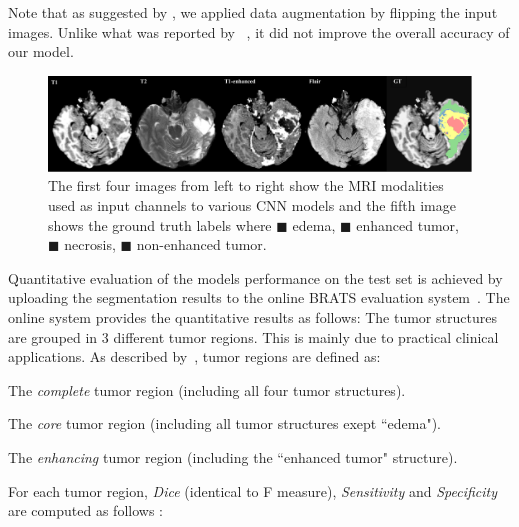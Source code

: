 \documentclass[final,5p,times,twocolumn]{elsarticle}
\begin{document}
Note that as suggested by \citet{Krizhevsky-2012-small}, we applied data augmentation by flipping the input images.  Unlike what was reported by ~\citet{zeiler2014},  it did not improve the overall accuracy of our model. 



%

\begin{figure}
\centering
\includegraphics[width=\linewidth]{data_tumor.pdf}
\caption{The first four images from left to right show the MRI modalities used as input channels to various CNN models and the fifth image shows the ground truth labels where \textcolor[RGB]{135,213,120}{$\blacksquare$} edema, \textcolor[RGB]{225,225,95}{$\blacksquare$} enhanced tumor,
\textcolor[RGB]{246,145,139}{$\blacksquare$} necrosis,
\textcolor[RGB]{124,167,208}{$\blacksquare$} non-enhanced tumor.}
\label{fig:data}
\end{figure} 

 Quantitative evaluation of the models performance on the test set is achieved by uploading the segmentation results to the online BRATS evaluation system~\citep{BRATSURL}. The online system provides the quantitative results as follows: 
The tumor structures are grouped in 3 different tumor regions. This is mainly due to practical clinical applications. 
As described by~\citet{Menze2014}, tumor regions are defined as:

\begin{enumerate}[a)]

{\setlength\itemindent{25pt} \item The {\it complete} tumor region (including all four tumor structures).}

{\setlength\itemindent{25pt}\item The {\it core} tumor region (including all tumor structures exept ``edema").}

{\setlength\itemindent{25pt}\item The {\it enhancing} tumor region (including the ``enhanced tumor" structure).}

\end{enumerate} 

For each tumor region, {\it Dice} (identical to F measure), {\it Sensitivity} and {\it Specificity} are computed as follows :
\end{document}
